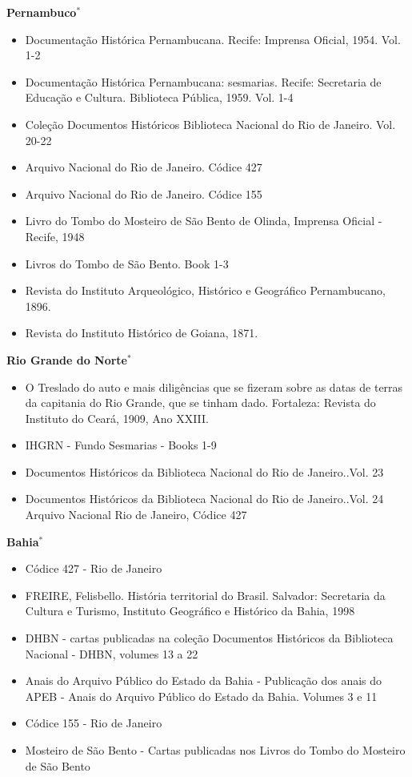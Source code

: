 \documentclass{article}
\begin{document}
\textbf{Pernambuco$^*$}
\begin{itemize}
\item Documentação Histórica Pernambucana. Recife: Imprensa Oficial, 1954. Vol. 1-2
\item Documentação Histórica Pernambucana: sesmarias. Recife: Secretaria de Educação e Cultura. Biblioteca Pública, 1959. Vol. 1-4
\item Coleção Documentos Históricos Biblioteca Nacional do Rio de Janeiro. Vol. 20-22
\item Arquivo Nacional do Rio de Janeiro. Códice 427
\item Arquivo Nacional do Rio de Janeiro. Códice 155
\item Livro do Tombo do Mosteiro de São Bento de Olinda, Imprensa Oficial - Recife, 1948
\item Livros do Tombo de São Bento. Book 1-3
\item Revista do Instituto Arqueológico, Histórico e Geográfico Pernambucano, 1896.
\item Revista do Instituto Histórico de Goiana, 1871.
\end{itemize}

\textbf{Rio Grande do Norte$^*$}
\begin{itemize}
  \item O Treslado do auto e mais diligências que se fizeram sobre as datas de terras da capitania do Rio Grande, que se tinham dado. Fortaleza: Revista do Instituto do Ceará, 1909, Ano XXIII.
  \item IHGRN - Fundo Sesmarias - Books 1-9
  \item Documentos Históricos da Biblioteca Nacional do Rio de Janeiro..Vol. 23
  \item Documentos Históricos da Biblioteca Nacional do Rio de Janeiro..Vol. 24 Arquivo Nacional Rio de Janeiro, Códice 427
\end{itemize}

\textbf{Bahia$^*$}
\begin{itemize}
  \item Códice 427 - Rio de Janeiro
  \item FREIRE, Felisbello. História territorial do Brasil. Salvador: Secretaria da Cultura e Turismo, Instituto Geográfico e Histórico da Bahia, 1998
  \item DHBN - cartas publicadas na coleção Documentos Históricos da Biblioteca Nacional - DHBN, volumes 13 a 22
  \item  Anais do Arquivo Público do Estado da Bahia - Publicação dos anais do APEB - Anais do Arquivo Público do Estado da Bahia. Volumes 3 e 11
  \item Códice 155 - Rio de Janeiro
  \item Mosteiro de São Bento - Cartas publicadas nos Livros do Tombo do Mosteiro de São Bento  
\end{itemize}
\end{document}
